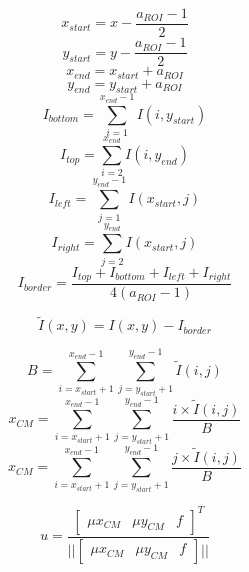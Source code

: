 \documentclass[12pt,a4paper,oneside]{article}
\begin{document}
\begin{equation}
x_{start} = x - \frac{a_{ROI} - 1}{2}
\end{equation}
\begin{equation}
y_{start} = y - \frac{a_{ROI} - 1}{2}
\end{equation}
\begin{equation}
x_{end} = x_{start} + a_{ROI}
\end{equation}
\begin{equation}
y_{end} = y_{start} + a_{ROI}
\end{equation}
\begin{equation}
I_{bottom} = \sum_{i=1}^{x_{end}-1} I(i, y_{start})
\end{equation}
\begin{equation}
I_{top} = \sum_{i=2}^{x_{end}} I(i, y_{end})
\end{equation}
\begin{equation}
I_{left} = \sum_{j=1}^{y_{end}-1} I(x_{start}, j)
\end{equation}
\begin{equation}
I_{right} = \sum_{j=2}^{y_{end}} I(x_{start}, j)
\end{equation}
\begin{equation}
I_{border} = \frac{I_{top} + I_{bottom} + I_{left} + I_{right}}{4(a_{ROI} - 1)}
\end{equation}

\begin{equation}
\tilde{I}(x,y) = I(x,y) - I_{border}
\end{equation}

\begin{equation}
B = \sum_{i=x_{start}+1}^{x_{end}-1}\sum_{j=y_{start}+1}^{y_{end}-1}\tilde{I}(i,j)
\end{equation}
\begin{equation}
x_{CM} = \sum_{i=x_{start}+1}^{x_{end}-1}\sum_{j=y_{start}+1}^{y_{end}-1}\frac{i \times \tilde{I}(i,j)}{B}
\end{equation}
\begin{equation}
x_{CM} = \sum_{i=x_{start}+1}^{x_{end}-1}\sum_{j=y_{start}+1}^{y_{end}-1}\frac{j \times \tilde{I}(i,j)}{B}
\end{equation}

\begin{equation}
u = \frac{
\begin{bmatrix}
\mu x_{CM} & \mu y_{CM} & f
\end{bmatrix}
^T}
{||
\begin{bmatrix}
\mu x_{CM} & \mu y_{CM} & f
\end{bmatrix}
||}
\end{equation}
\end{document}

